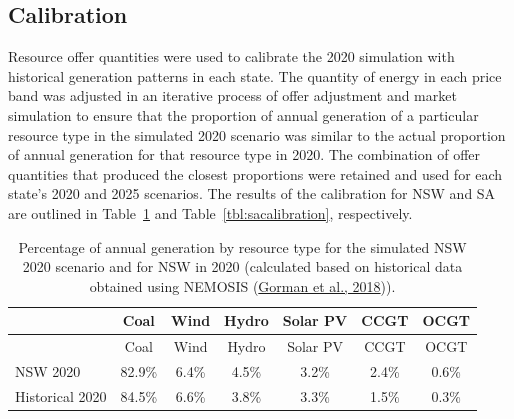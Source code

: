 \documentclass[12pt,a4paper,]{report}
\begin{document}
\let\pandoctableshortcapt\relax

\hypertarget{sec:calibration}{%
\subsection*{Calibration}\label{sec:calibration}}

Resource offer quantities were used to calibrate the 2020 simulation
with historical generation patterns in each state. The quantity of
energy in each price band was adjusted in an iterative process of offer
adjustment and market simulation to ensure that the proportion of annual
generation of a particular resource type in the simulated 2020 scenario
was similar to the actual proportion of annual generation for that
resource type in 2020. The combination of offer quantities that produced
the closest proportions were retained and used for each state's 2020 and
2025 scenarios. The results of the calibration for NSW and SA are
outlined in Table~\ref{tbl:nswcalibration} and
Table~\ref{tbl:sacalibration}, respectively.

\def\pandoctableshortcapt{NSW 2020 calibration results (by resource
type)}

\hypertarget{tbl:nswcalibration}{}
\begin{longtable}[]{@{}lcccccc@{}}
\caption[NSW 2020 calibration results (by resource
type)]{\label{tbl:nswcalibration}Percentage of annual generation by
resource type for the simulated NSW 2020 scenario and for NSW in 2020
(calculated based on historical data obtained using NEMOSIS
(\protect\hyperlink{ref-gormanNEMOSISNEMOpen2018}{Gorman et al.,
2018})).}\tabularnewline
\toprule\noalign{}
& Coal & Wind & Hydro & Solar PV & CCGT & OCGT \\
\midrule\noalign{}
\endfirsthead
\toprule\noalign{}
& Coal & Wind & Hydro & Solar PV & CCGT & OCGT \\
\midrule\noalign{}
\endhead
\bottomrule\noalign{}
\endlastfoot
NSW 2020 & 82.9\% & 6.4\% & 4.5\% & 3.2\% & 2.4\% & 0.6\% \\
Historical 2020 & 84.5\% & 6.6\% & 3.8\% & 3.3\% & 1.5\% & 0.3\% \\
\end{longtable}

\let\pandoctableshortcapt\relax

\def\pandoctableshortcapt{SA 2020 calibration results (by resource
type)}
\end{document}
